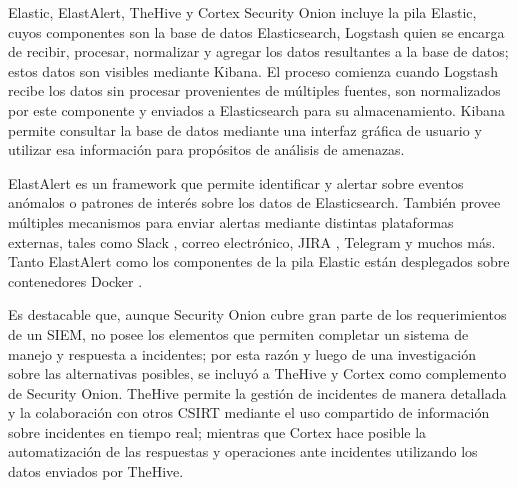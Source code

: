    \begin{subsection}{Elastic, ElastAlert, TheHive y Cortex}
        Security Onion incluye la pila Elastic, cuyos componentes son la base de datos Elasticsearch, Logstash quien se encarga de recibir, procesar, normalizar y agregar los datos resultantes a la base de datos; estos datos son visibles mediante Kibana. El proceso comienza cuando Logstash recibe los datos sin procesar provenientes de múltiples fuentes, son normalizados por este componente y enviados a Elasticsearch para su almacenamiento. Kibana permite consultar la base de datos mediante una interfaz gráfica de usuario y utilizar esa información para propósitos de análisis de amenazas. \par
        ElastAlert es un framework que permite identificar y alertar sobre eventos anómalos o patrones de interés sobre los datos de Elasticsearch. También provee múltiples mecanismos para enviar alertas mediante distintas plataformas externas, tales como Slack \cite{slack}, correo electrónico, JIRA \cite{jira}, Telegram \cite{telegram} y muchos más. Tanto ElastAlert como los componentes de la pila Elastic están desplegados sobre contenedores Docker \cite{docker}. \par
        Es destacable que, aunque Security Onion cubre gran parte de los requerimientos de un SIEM, no posee los elementos que permiten completar un sistema de manejo y respuesta a incidentes; por esta razón y luego de una investigación sobre las alternativas posibles, se incluyó a TheHive \cite{thehive} y Cortex \cite{thehive} como complemento de Security Onion. TheHive permite la gestión de incidentes de manera detallada y la colaboración con otros CSIRT mediante el uso compartido de información sobre incidentes en tiempo real; mientras que Cortex hace posible la automatización de las respuestas y operaciones ante incidentes utilizando los datos enviados por TheHive. \par

   \end{subsection}
